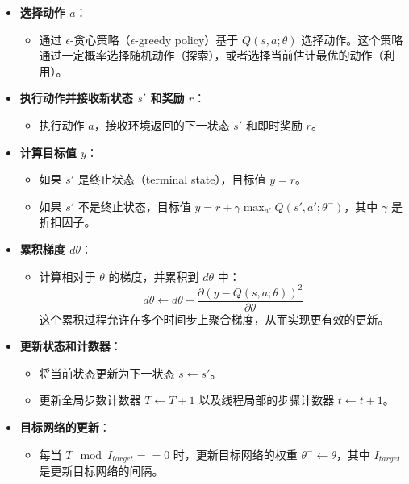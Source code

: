 \documentclass[twocolumn, 10pt]{article} %
\theoremstyle{remark}
\begin{document}
\begin{itemize}
    \item \textbf{选择动作 \( a \)}：
    \begin{itemize}
        \item 通过 \(\epsilon\)-贪心策略（\(\epsilon\)-greedy policy）基于 \( Q(s, a; \theta) \) 选择动作。这个策略通过一定概率选择随机动作（探索），或者选择当前估计最优的动作（利用）。
    \end{itemize}
    
    \item \textbf{执行动作并接收新状态 \( s' \) 和奖励 \( r \)}：
    \begin{itemize}
        \item 执行动作 \( a \)，接收环境返回的下一状态 \( s' \) 和即时奖励 \( r \)。
    \end{itemize}
    
    \item \textbf{计算目标值 \( y \)}：
    \begin{itemize}
        \item 如果 \( s' \) 是终止状态（terminal state），目标值 \( y = r \)。
        \item 如果 \( s' \) 不是终止状态，目标值 \( y = r + \gamma \max_{a'} Q(s', a'; \theta^-) \)，其中 \( \gamma \) 是折扣因子。
    \end{itemize}
    
    \item \textbf{累积梯度 \( d\theta \)}：
    \begin{itemize}
        \item 计算相对于 \( \theta \) 的梯度，并累积到 \( d\theta \) 中：
        \[
        d\theta \leftarrow d\theta + \frac{\partial (y - Q(s, a; \theta))^2}{\partial \theta}
        \]
        这个累积过程允许在多个时间步上聚合梯度，从而实现更有效的更新。
    \end{itemize}
    
    \item \textbf{更新状态和计数器}：
    \begin{itemize}
        \item 将当前状态更新为下一状态 \( s \leftarrow s' \)。
        \item 更新全局步数计数器 \( T \leftarrow T + 1 \) 以及线程局部的步骤计数器 \( t \leftarrow t + 1 \)。
    \end{itemize}
    
    \item \textbf{目标网络的更新}：
    \begin{itemize}
        \item 每当 \( T \mod I_{target} == 0 \) 时，更新目标网络的权重 \( \theta^- \leftarrow \theta \)，其中 \( I_{target} \) 是更新目标网络的间隔。
    \end{itemize}
    

\end{itemize}
\end{document}
